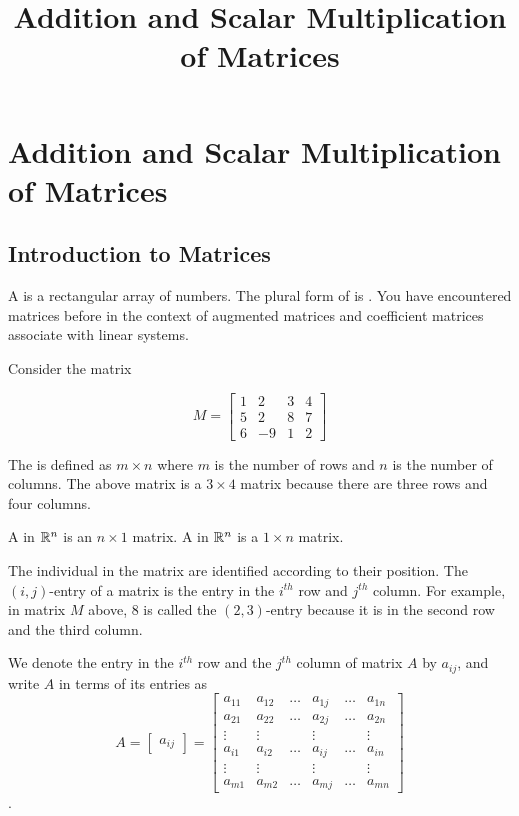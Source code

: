 \documentclass{ximera}
\title{Addition and Scalar Multiplication of Matrices} \license{CC BY-NC-SA 4.0}
\begin{document}
\begin{abstract}
\end{abstract}
\maketitle

\section*{Addition and Scalar Multiplication of Matrices}

\subsection*{Introduction to Matrices}

A  is a rectangular array of numbers. The plural form of  is . You have encountered matrices before in the context of augmented matrices and coefficient matrices associate with linear systems.

Consider the matrix

$$M=\begin{bmatrix}
1 & 2 & 3 & 4 \\
5 & 2 & 8 & 7 \\
6 & -9 & 1 & 2
\end{bmatrix}$$

The  is defined as $m\times n$ where $m$ is the
number of rows and $n$ is the number of columns. The above matrix is a 
$3\times 4$ matrix because there are three rows and four columns.  

A  in $\mathbb{R}^n$ is an $n\times 1$ matrix.  A  in $\mathbb{R}^n$ is a $1\times n$ matrix.  

The individual  in the matrix are identified according to their position. The $( i, j)$-entry of a matrix is the entry 
in the $i^{th}$ row and $j^{th}$ column. For example, in matrix $M$ above,  $8$ is called the $(2,3)$-entry because it is in the second row and the third column. 

We denote the entry in the $i^{th}$ row  and the $j^{th}$ column of matrix $A$ by $a_{ij}$, and write $A$ in terms of its entries
as $$A= \begin{bmatrix} a_{ij} \end{bmatrix}=\begin{bmatrix}
           a_{11} & a_{12}&\dots&a_{1j}&\dots&a_{1n}\\
           a_{21}&a_{22} &\dots&a_{2j}&\dots &a_{2n}\\
		\vdots & \vdots&&\vdots&&\vdots\\
        a_{i1}&a_{i2}&\dots &a_{ij}&\dots &a_{in}\\
        \vdots & \vdots&&\vdots&&\vdots\\
		a_{m1}&a_{m2}&\dots &a_{mj}&\dots &a_{mn}
         \end{bmatrix}$$. 
\end{document}
